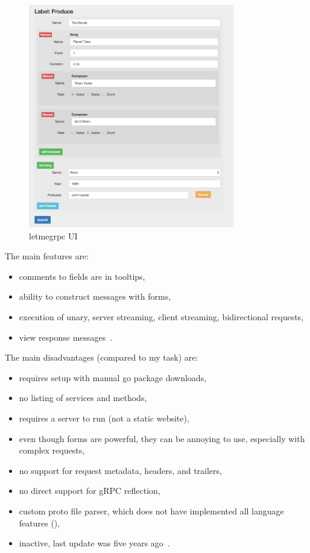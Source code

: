 \begin{figure}[hbt!]
    \centering
    \captionsetup{justification=centering}
    \includegraphics[width=0.8\textwidth]{images/grpc/letmegrpc}
    \caption{letmegrpc UI~\cite{grpc-letmegrpc}}
    \label{fig:grpc-letmegrpc}
\end{figure}

The main features are:
\begin{itemize}
    \item comments to fields are in tooltips,
    \item ability to construct messages with forms,
    \item execution of unary, server streaming, client streaming, bidirectional requests,
    \item view response messages~\cite{grpc-letmegrpc}.
\end{itemize}

The main disadvantages (compared to my task) are:
\begin{itemize}
    \item requires setup with manual go package downloads,
    \item no listing of services and methods,
    \item requires a server to run (not a static website),
    \item even though forms are powerful, they can be annoying to use, especially with complex requests,
    \item no support for request metadata, headers, and trailers,
    \item no direct support for gRPC reflection,
    \item custom proto file parser, which does not have implemented all language features (\cite{grpc-letmegrpc-issue44}),
    \item inactive, last update was five years ago~\cite{grpc-letmegrpc}.
\end{itemize}

